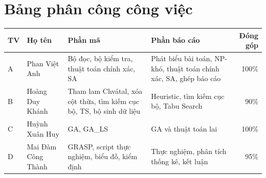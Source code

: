 \documentclass[a4paper,12pt]{article}
\begin{document}
\appendix
\section{Bảng phân công công việc}
\begin{center}
\small
\begin{tabularx}{\textwidth}{llYYr}
\toprule
TV & Họ tên & Phần mã & Phần báo cáo & Đóng góp\\
\midrule
A & Phan Việt Anh & Bộ đọc, bộ kiểm tra, thuật toán chính xác, SA & Phát biểu bài toán, NP-khó, thuật toán chính xác, SA, ghép báo cáo & 100\%\\
B & Hoàng Duy Khánh & Tham lam Chvátal, xóa cột thừa, tìm kiếm cục bộ, TS, bộ sinh dữ liệu & Heuristic, tìm kiếm cục bộ, Tabu Search & 90\%\\
C & Huỳnh Xuân Huy & GA, GA\_LS & GA và thuật toán lai & 100\%\\
D & Mai Đàm Công Thành & GRASP, script thực nghiệm, biểu đồ, kiểm định & Thực nghiệm, phân tích thống kê, kết luận & 95\%\\
\bottomrule
\end{tabularx}
\end{center}
\end{document}
